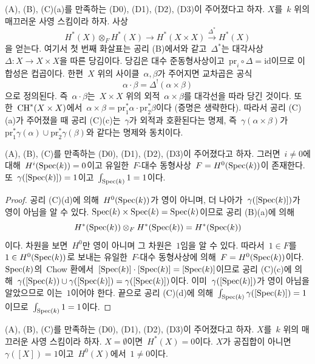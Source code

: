 \begin{remark}
\label{remark-replace-cup-product}
(A), (B), (C)(a)를 만족하는 (D0), (D1), (D2), (D3)이 주어졌다고 하자.
$X$를\  $k$ 위의 매끄러운 사영 스킴이라 하자. 사상
$$
H^*(X) \otimes_F H^*(X) \longrightarrow H^*(X \times X)
\xrightarrow{\Delta^*} H^*(X)
$$
을 얻는다. 여기서 첫 번째 화살표는 공리 (B)에서와 같고\  $\Delta^*$는
대각사상\  $\Delta : X \to X \times X$을 따른 당김이다. 당김은 대수
준동형사상이고\  $\text{pr}_i \circ \Delta = \text{id}$이므로 이 합성은
컵곱이다. 한편\  $X$ 위의 사이클\  $\alpha, \beta$가 주어지면 교차곱은
공식
$$
\alpha \cdot \beta =
\Delta^!(\alpha \times \beta)
$$
으로 정의된다. 즉\  $\alpha \cdot \beta$는\  $X \times X$ 위의 외적\ 
$\alpha \times \beta$를 대각선을 따라 당긴 것이다. 또한\ 
$\mathop{\mathrm{CH}}\nolimits^*(X \times X)$에서\ 
$\alpha \times \beta = \text{pr}_1^*\alpha \cdot \text{pr}_2^*\beta$이다
(증명은 생략한다). 따라서 공리 (C)(a)가 주어졌을 때 공리 (C)(c)는\ 
$\gamma$가 외적과 호환된다는 명제, 즉\  $\gamma(\alpha \times \beta)$가\ 
$\text{pr}_1^*\gamma(\alpha) \cup \text{pr}_2^*\gamma(\beta)$와
같다는 명제와 동치이다.
\end{remark}

\begin{lemma}
\label{lemma-base}
(A), (B), (C)를 만족하는 (D0), (D1), (D2), (D3)이 주어졌다고 하자.
그러면\  $i \not = 0$에 대해\  $H^i(\mathop{\mathrm{Spec}}(k)) = 0$이고 유일한\ 
$F$-대수 동형사상\  $F = H^0(\mathop{\mathrm{Spec}}(k))$이 존재한다.
또\  $\gamma([\mathop{\mathrm{Spec}}(k)]) = 1$이고\  $\int_{\mathop{\mathrm{Spec}}(k)} 1 = 1$이다.
\end{lemma}

\begin{proof}
공리 (C)(d)에 의해\  $H^0(\mathop{\mathrm{Spec}}(k))$가 영이 아니며, 더 나아가\ 
$\gamma([\mathop{\mathrm{Spec}}(k)])$가 영이 아님을 알 수 있다.
$\mathop{\mathrm{Spec}}(k) \times \mathop{\mathrm{Spec}}(k) = \mathop{\mathrm{Spec}}(k)$이므로 공리 (B)(a)에 의해
$$
H^*(\mathop{\mathrm{Spec}}(k)) \otimes_F H^*(\mathop{\mathrm{Spec}}(k)) = H^*(\mathop{\mathrm{Spec}}(k))
$$
이다. 차원을 보면\  $H^0$만 영이 아니며 그 차원은\  $1$임을 알 수 있다.
따라서\  $1 \in F$를\  $1 \in H^0(\mathop{\mathrm{Spec}}(k))$로 보내는 유일한\ 
$F$-대수 동형사상에 의해\  $F = H^0(\mathop{\mathrm{Spec}}(k))$이다.
$\mathop{\mathrm{Spec}}(k)$의\  Chow 환에서\ 
$[\mathop{\mathrm{Spec}}(k)] \cdot [\mathop{\mathrm{Spec}}(k)] = [\mathop{\mathrm{Spec}}(k)]$이므로 공리 (C)(c)에 의해\ 
$\gamma([\mathop{\mathrm{Spec}}(k)) \cup \gamma([\mathop{\mathrm{Spec}}(k)]) = \gamma([\mathop{\mathrm{Spec}}(k)])$이다.
이미\  $\gamma([\mathop{\mathrm{Spec}}(k)])$가 영이 아님을 알았으므로 이는\  $1$이어야 한다.
끝으로 공리 (C)(d)에 의해\ 
$\int_{\mathop{\mathrm{Spec}}(k)} \gamma([\mathop{\mathrm{Spec}}(k)]) = 1$이므로\ 
$\int_{\mathop{\mathrm{Spec}}(k)} 1 = 1$이다.
\end{proof}

\begin{lemma}
\label{lemma-unit}
(A), (B), (C)를 만족하는 (D0), (D1), (D2), (D3)이 주어졌다고 하자.
$X$를\  $k$ 위의 매끄러운 사영 스킴이라 하자.
$X = \emptyset$이면\  $H^*(X) = 0$이다.
$X$가 공집합이 아니면\  $\gamma([X]) = 1$이고\  $H^0(X)$에서\ 
$1 \not = 0$이다.
\end{lemma}

